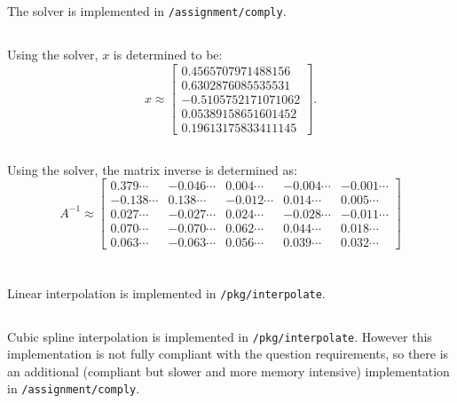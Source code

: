 \documentclass[10pt, a4paper]{article}
\begin{document}
  \subsection{}
  The solver is implemented in \texttt{/assignment/comply}.

  \subsection{}
  Using the solver, $x$ is determined to be:
  \begin{equation}
    x \approx \begin{bmatrix}0.4565707971488156 \\ 0.6302876085535531 \\ -0.5105752171071062 \\ 0.05389158651601452 \\ 0.19613175833411145\end{bmatrix}.
  \end{equation}

  \subsection{}
  Using the solver, the matrix inverse is determined as:
  \begin{equation}
    A^{-1} \approx \begin{bmatrix}0.379\cdots & -0.046\cdots & 0.004\cdots & -0.004\cdots & -0.001\cdots \\ -0.138\cdots & 0.138\cdots & -0.012\cdots & 0.014\cdots & 0.005\cdots \\ 0.027\cdots & -0.027\cdots & 0.024\cdots & -0.028\cdots & -0.011\cdots \\ 0.070\cdots & -0.070\cdots & 0.062\cdots & 0.044\cdots & 0.018\cdots \\ 0.063\cdots & -0.063\cdots & 0.056\cdots & 0.039\cdots & 0.032\cdots\end{bmatrix}
  \end{equation}

\section{}
  \subsection{}
  Linear interpolation is implemented in \texttt{/pkg/interpolate}.

  \subsection{}
  Cubic spline interpolation is implemented in \texttt{/pkg/interpolate}. However this implementation is
  not fully compliant with the question requirements, so there is an additional (compliant but slower and
  more memory intensive) implementation in \texttt{/assignment/comply}.
\end{document}
